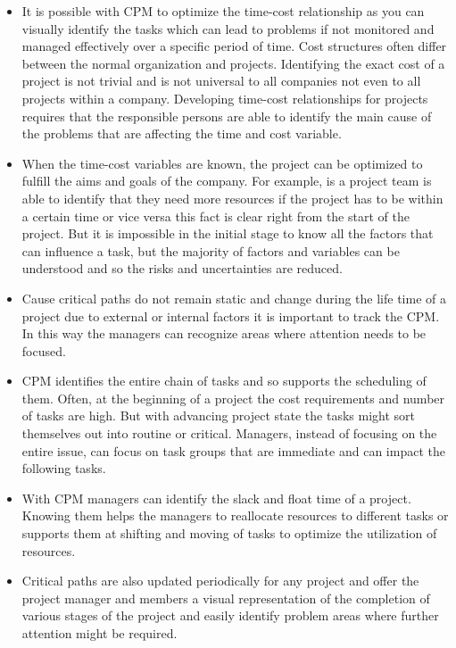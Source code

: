 \begin{itemize}
\item It is possible with CPM to optimize the time-cost relationship as you can visually identify the
tasks which can lead to problems if not monitored and managed effectively over a specific period of
time. Cost structures often differ between the normal organization and projects. Identifying the
exact cost of a project is not trivial and is not universal to all companies not even to all
projects within a company. Developing time-cost relationships for projects requires that the
responsible persons are able to identify the main cause of the problems that are affecting the time
and cost variable.

\item When the time-cost variables are known, the project can be optimized to fulfill the aims and goals
of the company. For example, is a project team is able to identify that they need more resources if
the project has to be within a certain time or vice versa this fact is clear right from the start of
the project. But it is impossible in the initial stage to know all the factors that can influence a
task, but the majority of factors and variables can be understood and so the risks and uncertainties
are reduced.

\item Cause critical paths do not remain static and change during the life time of a project due to
external or internal factors it is important to track the CPM. In this way the managers can
recognize areas where attention needs to be focused.

\item CPM identifies the entire chain of tasks and so supports the scheduling of them. Often, at the
beginning of a project the cost requirements and number of tasks are high. But with advancing
project state the tasks might sort themselves out into routine or critical. Managers, instead of
focusing on the entire issue, can focus on task groups that are immediate and can impact the
following tasks.

\item With CPM managers can identify the slack and float time of a project. Knowing them helps the
managers to reallocate resources to different tasks or supports them at shifting and moving of tasks
to optimize the utilization of resources.

\item Critical paths are also updated periodically for any project and offer the project manager and
members a visual representation of the completion of various stages of the project and easily
identify problem areas where further attention might be required.


\end{itemize}
